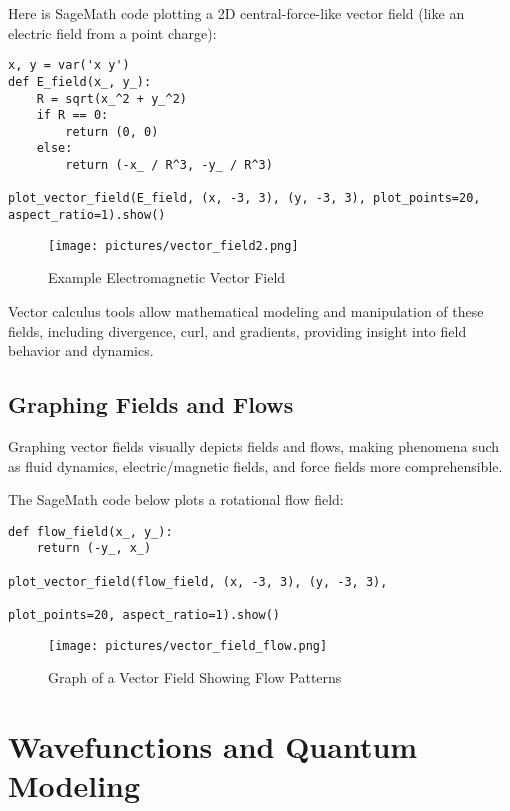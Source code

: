 \documentclass[12pt]{book}
\begin{document}
Here is SageMath code plotting a 2D central-force-like vector field (like an electric field from a point charge):

\begin{verbatim}
x, y = var('x y')
def E_field(x_, y_):
    R = sqrt(x_^2 + y_^2)
    if R == 0:
        return (0, 0)
    else:
        return (-x_ / R^3, -y_ / R^3)

plot_vector_field(E_field, (x, -3, 3), (y, -3, 3), plot_points=20, aspect_ratio=1).show()
\end{verbatim}

\begin{figure}[H]
  \centering
  \texttt{[image: pictures/vector\_field2.png]}
  \caption{Example Electromagnetic Vector Field}
  \label{fig:em_vector_field}
\end{figure}

Vector calculus tools allow mathematical modeling and manipulation of these fields, including divergence, curl, and gradients, providing insight into field behavior and dynamics.

\section{Graphing Fields and Flows}

Graphing vector fields visually depicts fields and flows, making phenomena such as fluid dynamics, electric/magnetic fields, and force fields more comprehensible.

The SageMath code below plots a rotational flow field:

\begin{verbatim}
def flow_field(x_, y_):
    return (-y_, x_)

plot_vector_field(flow_field, (x, -3, 3), (y, -3, 3), 

plot_points=20, aspect_ratio=1).show()
\end{verbatim}

\begin{figure}[H]
  \centering
  \texttt{[image: pictures/vector\_field\_flow.png]}
  \caption{Graph of a Vector Field Showing Flow Patterns}
  \label{fig:vector_field_flow}
\end{figure}

\chapter{Wavefunctions and Quantum Modeling}
\end{document}
